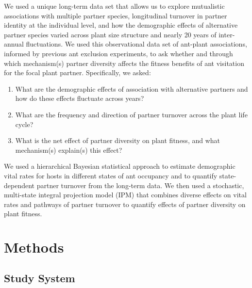 \documentclass[11pt]{article}
\begin{document}
We used a unique long-term data set that allows us to explore mutualistic associations with multiple partner species, longitudinal turnover in partner identity at the individual level, and how the demographic effects of alternative partner species varied across plant size structure and nearly 20 years of inter-annual fluctuations. 
We used this observational data set of ant-plant associations, informed by previous ant exclusion experiments, to ask whether and through which mechanism(s) partner diversity affects the fitness benefits of ant visitation for the focal plant partner. 
Specifically, we asked:
	\begin{enumerate}	
		\item{What are the demographic effects of association with alternative partners and how do these effects fluctuate across years?}
		\item{What are the frequency and direction of partner turnover across the plant life cycle?}	
		\item{What is the net effect of partner diversity on plant fitness, and what mechanism(s) explain(s) this effect?}
	\end{enumerate}
We used a hierarchical Bayesian statistical approach to estimate demographic vital rates for hosts in different states of ant occupancy and to quantify state-dependent partner turnover from the long-term data. 
We then used a stochastic, multi-state integral projection model (IPM) that combines diverse effects on vital rates and pathways of partner turnover to quantify effects of partner diversity on plant fitness. 


\section*{Methods}
\subsection*{Study System}
  
\end{document}
